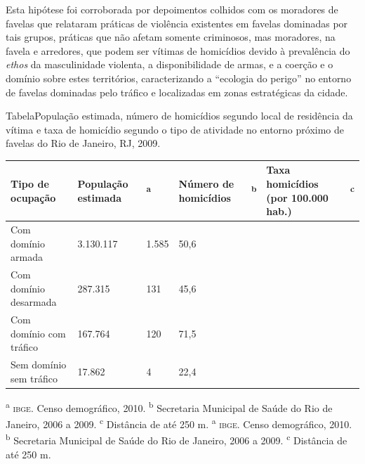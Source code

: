 \documentclass{article}
\begin{document}
Esta hipótese foi corroborada por depoimentos colhidos com os moradores de
favelas que relataram práticas de violência existentes em favelas dominadas por
tais grupos, práticas que não afetam somente criminosos, mas moradores, na
favela e arredores, que podem ser vítimas de homicídios devido à prevalência do
\textit{ethos}
da masculinidade violenta, a disponibilidade de armas, e a coerção e o domínio
sobre estes territórios, caracterizando a “ecologia do perigo” no entorno de
favelas dominadas pelo tráfico e localizadas em zonas estratégicas da cidade.

TabelaPopulação estimada, número de homicídios segundo local de residência da
vítima e taxa de homicídio segundo o tipo de atividade no entorno próximo de
favelas do Rio de Janeiro, RJ, 2009.
\begin{table}
\begin{xtabular}{ l | l | l | l | l | l | l }
\hline
Tipo de ocupação & População estimada &\textsuperscript{a}
& Número de homicídios &\textsuperscript{b}
& Taxa homicídios (por 100.000 hab.) &\textsuperscript{c}
\\ \hline
Com domínio armada
& 3.130.117
& 1.585
& 50,6
\\ \hline

Com domínio desarmada
& 287.315
& 131
& 45,6
\\ \hline

Com domínio com tráfico
& 167.764
& 120
& 71,5
\\ \hline

Sem domínio sem tráfico
& 17.862
& 4
& 22,4
\\ \hline

\end{xtabular}
\end{table}
\textsuperscript{a}
\textsc{ibge}. Censo demográfico, 2010.
\textsuperscript{b}
Secretaria Municipal de Saúde do Rio de Janeiro, 2006 a 2009.
\textsuperscript{c}
Distância de até 250 m.
\textsuperscript{a}
\textsc{ibge}. Censo demográfico, 2010.
\textsuperscript{b}
Secretaria Municipal de Saúde do Rio de Janeiro, 2006 a 2009.
\textsuperscript{c}
Distância de até 250 m.
\end{document}
